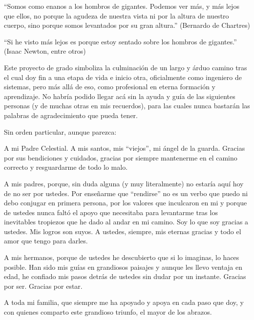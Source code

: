 \begin{displayquote}``Somos como enanos a los hombros de gigantes. Podemos ver más, y más lejos que ellos, no porque la agudeza de nuestra vista ni por la altura de nuestro cuerpo, sino porque somos levantados por su gran altura.'' (Bernardo de Chartres)
\end{displayquote}
\begin{displayquote}
``Si he visto más lejos es porque estoy sentado sobre los hombros de gigantes.'' (Isaac Newton, entre otros)
\end{displayquote}

Este proyecto de grado simboliza la culminación de un largo y árduo camino tras el cual doy fin a una etapa de vida e inicio otra, oficialmente como ingeniero de sistemas, pero más allá de eso, como profesional en eterna formación y aprendizaje. No habría podido llegar acá sin la ayuda y guía de las siguientes personas (y de muchas otras en mis recuerdos), para las cuales nunca bastarán las palabras de agradecimiento que pueda tener.

\vspace{4mm}

Sin orden particular, aunque parezca:

\vspace{4mm}

A mi Padre Celestial. A mis santos, mis ``viejos'', mi ángel de la guarda. Gracias por sus bendiciones y cuidados, gracias por siempre mantenerme en el camino correcto y resguardarme de todo lo malo.

A mis padres, porque, sin duda alguna (y muy literalmente) no estaría aquí hoy de no ser por ustedes. Por enseñarme que ``rendirse'' no es un verbo que puedo ni debo conjugar en primera persona, por los valores que inculcaron en mi y porque de ustedes nunca faltó el apoyo que necesitaba para levantarme tras los inevitables tropiezos que he dado al andar en mi camino. Soy lo que soy gracias a ustedes. Mis logros son suyos. A ustedes, siempre, mis eternas gracias y todo el amor que tengo para darles.

A mis hermanos, porque de ustedes he descubierto que si lo imaginas, lo haces posible. Han sido mis guías en grandiosos paisajes y aunque les llevo ventaja en edad, he confiado mis pasos detrás de ustedes sin dudar por un instante. Gracias por ser. Gracias por estar.

A toda mi familia, que siempre me ha apoyado y apoya en cada paso que doy, y con quienes comparto este grandioso triunfo, el mayor de los abrazos.

